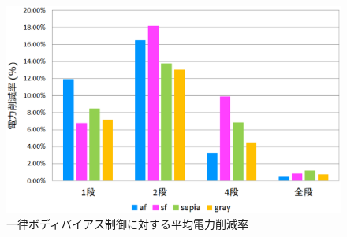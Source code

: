 {\begin{figure}[h]
\centering
\includegraphics[clip, width=14cm]{./chap6/fig/reduction_vs_uniform.eps}
\caption{一律ボディバイアス制御に対する平均電力削減率}
\label{fig:reduction_vs_uniform}
\end{figure}

}